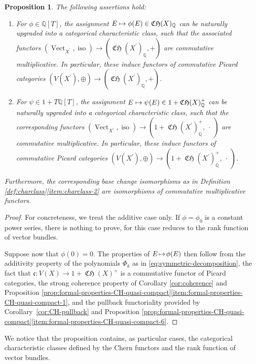\documentclass[JEP,XML,SOM,Unicode,published]{cedram}
\newcommand\mto{\mathchoice{\longmapsto}{\mapsto}{\mapsto}{\mapsto}}
\theoremstyle{plain}
\newtheorem{proposition}[theorem]{Proposition}
\theoremstyle{definition}
\newcommand{\QBbb}{\mathbb Q}
\newcommand{\cfrak}{\mathfrak c}
\DeclareMathOperator{\CHfrak}{\mathfrak{CH}}
\DeclareMathOperator{\iso}{iso}
\DeclareMathOperator{\Vect}{Vect}
\begin{document}
\begin{proposition}\label{prop:additcharclass}
The following assertions hold:
\begin{enumerate}\label{enum:characteristic-classes}
\item\label{enum:characteristic-classes-1} For $\phi\in\QBbb[T]$, the assignment $E\mto \phi(E)\in\CHfrak(X)_{\QBbb}$ can be naturally upgraded into a categorical characteristic class, such that the associated functors \hbox{$(\Vect_{X^{\prime}},\iso) \to (\CHfrak(X^{\prime})_{\QBbb}, +)$} are commutative multiplicative. In particular, these induce functors of commutative Picard categories $(V(X^{\prime}),\oplus) \to (\CHfrak(X^{\prime})_{\QBbb}, +)$.
\item\label{enum:characteristic-classes-2} For $\psi\in 1+T\QBbb[T]$, the assignment $E \mto \psi(E) \in 1+\CHfrak(X)_{\QBbb}^{+}$ can be naturally upgraded into a categorical characteristic class, such that the corresponding functors $(\Vect_{X^{\prime}},\iso)\to (1+\CHfrak(X^{\prime})_{\QBbb}^{+},\ \cdot\ )$ are commutative multiplicative. In particular, these induce functors of commutative Picard categories $(V(X^{\prime}),\oplus) \to (1+\CHfrak(X^{\prime})_{\QBbb}^{+}, \ \cdot\ )$.
\end{enumerate}
Furthermore, the corresponding base change isomorphisms as in Definition \ref{def:charclass}\eqref{item:charclass-2} are isomorphisms of commutative multiplicative functors.
\end{proposition}
\begin{proof}
For concreteness, we treat the additive case only. If $\phi=\phi_{0}$ is a constant power series, there is nothing to prove, for this case reduces to the rank function of vector bundles.

Suppose now that $\phi(0)\!=\!0$. The properties of $E\!\mto\! \phi(E)$ then follow from the addi\-tivity property of the polynomials $\Phi_{k}$ as in \eqref{eq:symmetric-decomposition}, the fact that \hbox{$\cfrak\colon V(X)\!\to\! 1\!+\!\CHfrak(X)^{+}$} is a commutative functor of Picard categories, the strong coherence property of Corollary \ref{cor:coherence} and Proposition \ref{prop:formal-properties-CH-quasi-compact}\eqref{item:formal-properties-CH-quasi-compact-1}, and the pullback functoriality provided by Corollary~\ref{cor:CH-pullback} and Proposition \ref{prop:formal-properties-CH-quasi-compact}\eqref{item:formal-properties-CH-quasi-compact-6}.
\end{proof}

We notice that the proposition contains, as particular cases, the categorical characteristic classes defined by the Chern functors and the rank function of vector bundles.
\end{document}
